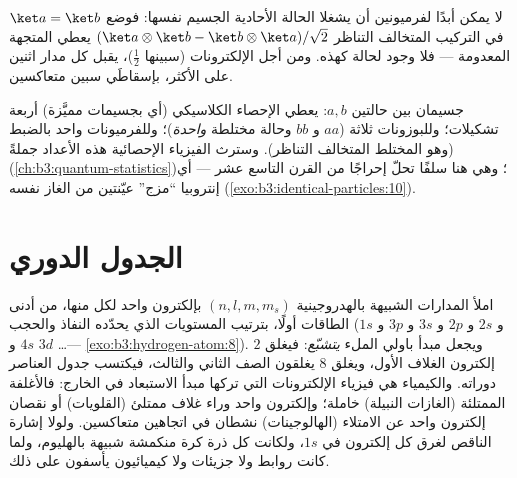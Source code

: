 \begin{corollary}\label{cor:b3:identical-particles:pauli}
لا يمكن أبدًا لفرميونين أن يشغلا الحالة الأحادية الجسيم نفسها: فوضع
$\ket a = \ket b$ في التركيب المتخالف التناظر
$(\ket a\otimes\ket b - \ket b\otimes\ket a)/\sqrt2$ يعطي المتجهة
المعدومة --- فلا وجود لحالة كهذه. ومن أجل الإلكترونات (سبينها $\tfrac12$)،
يقبل كل مدار اثنين على الأكثر، بإسقاطَي سبين متعاكسين.
\end{corollary}

\begin{example}\label{ex:b3:identical-particles:counting}
جسيمان بين حالتين $a, b$: يعطي الإحصاء الكلاسيكي (أي بجسيمات
مميَّزة) أربعة تشكيلات؛ وللبوزونات ثلاثة ($aa$ و $bb$
وحالة مختلطة \emph{واحدة})؛ وللفرميونات واحد بالضبط (وهو المختلط
المتخالف التناظر). وسترث الفيزياء الإحصائية هذه الأعداد
جملةً (\cref{ch:b3:quantum-statistics})؛ وهي هنا سلفًا تحلّ
إحراجًا من القرن التاسع عشر --- أي إنتروبيا ``مزج''
عيّنتين من الغاز نفسه
(\cref{exo:b3:identical-particles:10}).
\end{example}

\section{الجدول الدوري}

\begin{proposition}\label{prop:b3:identical-particles:periodic}
املأ المدارات الشبيهة بالهدروجينية $(n, l, m, m_s)$ بإلكترون
واحد لكل منها، من أدنى الطاقات أولًا، بترتيب المستويات الذي يحدّده النفاذ
والحجب ($1s$ و $2s$ و $2p$ و $3s$ و $3p$ و $4s$ و $3d$ \dots ---
\cref{exo:b3:hydrogen-atom:8}). ويجعل مبدأ باولي الملء
\emph{يتشبّع}: فيغلق $2$ إلكترون الغلاف الأول، ويغلق $8$
يغلقون الصف الثاني والثالث، فيكتسب جدول العناصر
دوراته. والكيمياء هي فيزياء الإلكترونات التي تركها مبدأ
الاستبعاد في الخارج: فالأغلفة الممتلئة (الغازات النبيلة)
خاملة؛ وإلكترون واحد وراء غلاف ممتلئ (القلويات) أو نقصان
إلكترون واحد عن الامتلاء (الهالوجينات) نشطان في اتجاهين متعاكسين. ولولا إشارة
الناقص لغرق كل إلكترون في $1s$، ولكانت كل ذرة كرة
منكمشة شبيهة بالهليوم، ولما كانت روابط ولا
جزيئات ولا كيميائيون يأسفون على ذلك.
\end{proposition}
\admitted

